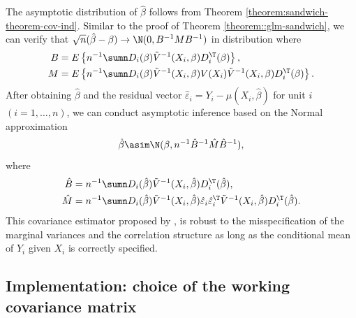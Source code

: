 The asymptotic distribution of $\hat{\beta}$ follows from Theorem \ref{theorem:sandwich-theorem-cov-ind}. Similar to the proof of Theorem \ref{theorem::glm-sandwich}, we can verify that $\sqrt{n}(\hat{\beta}-\beta)\rightarrow\N(0,B^{-1}MB^{-1})$
in distribution where
\begin{align*}
B & =E\left\{ n^{-1}\sumn  D_{i} (\beta)\tilde{V}^{-1}(X_{i}, \beta)D_{i}^{\T}(\beta)\right\} ,\\
M & =E\left\{ n^{-1}\sumn D_{i} (\beta)\tilde{V}^{-1}(X_{i}, \beta)V(X_{i})\tilde{V}^{-1}(X_{i}, \beta)D_{i}^{\T}(\beta)\right\} .
\end{align*}
After obtaining $\hat{\beta}$ and the residual vector $\hat{\varepsilon}_{i}=Y_{i}-\mu(X_{i},\hat{\beta})$
for unit $i$ $(i=1,\ldots,n)$, we can conduct asymptotic inference
based on the Normal approximation 
\[
\hat{\beta}\asim\N(\beta,n^{-1}\hat{B}^{-1}\hat{M}\hat{B}^{-1}),
\]
where 
\begin{align*}
\hat{B} & =n^{-1}\sumn D_{i} (\hat{\beta})\tilde{V}^{-1}(X_{i}, \hat{\beta})D_{i}^{\T}(\hat{\beta}),\\
\hat{M} & =n^{-1}\sumn D_{i} (\hat{\beta})\tilde{V}^{-1}(X_{i}, \hat{\beta})\hat{\varepsilon}_{i}\hat{\varepsilon}_{i}^{\T}\tilde{V}^{-1}(X_{i}, \hat{\beta})D_{i}^{\T}(\hat{\beta}).
\end{align*}
This covariance estimator proposed by \citet{liang1986longitudinal}, is robust to the misspecification of the marginal variances and the correlation structure as long as the conditional mean of $Y_i$ given $X_i$ is correctly specified.  




\subsection{Implementation: choice of the working covariance matrix}
\label{chapter::working-correlation}

